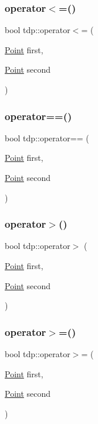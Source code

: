 \subsubsection{\texorpdfstring{operator$<$=()}{operator<=()}}
{\footnotesize\ttfamily bool tdp\+::operator$<$= (\begin{DoxyParamCaption}\item[{\mbox{\hyperlink{structtdp_1_1_point}{Point}}}]{first,  }\item[{\mbox{\hyperlink{structtdp_1_1_point}{Point}}}]{second }\end{DoxyParamCaption})}

\mbox{\label{namespacetdp_ac28871640d9ee5c6f37f75be07b6d187}} 
\subsubsection{\texorpdfstring{operator==()}{operator==()}}
{\footnotesize\ttfamily bool tdp\+::operator== (\begin{DoxyParamCaption}\item[{\mbox{\hyperlink{structtdp_1_1_point}{Point}}}]{first,  }\item[{\mbox{\hyperlink{structtdp_1_1_point}{Point}}}]{second }\end{DoxyParamCaption})}

\mbox{\label{namespacetdp_a948b73cf0c6d99e08e145094d83d8e97}} 
\subsubsection{\texorpdfstring{operator$>$()}{operator>()}}
{\footnotesize\ttfamily bool tdp\+::operator$>$ (\begin{DoxyParamCaption}\item[{\mbox{\hyperlink{structtdp_1_1_point}{Point}}}]{first,  }\item[{\mbox{\hyperlink{structtdp_1_1_point}{Point}}}]{second }\end{DoxyParamCaption})}

\mbox{\label{namespacetdp_a88169ae92b50b53e80d23d8df9d263d1}} 
\subsubsection{\texorpdfstring{operator$>$=()}{operator>=()}}
{\footnotesize\ttfamily bool tdp\+::operator$>$= (\begin{DoxyParamCaption}\item[{\mbox{\hyperlink{structtdp_1_1_point}{Point}}}]{first,  }\item[{\mbox{\hyperlink{structtdp_1_1_point}{Point}}}]{second }\end{DoxyParamCaption})}

